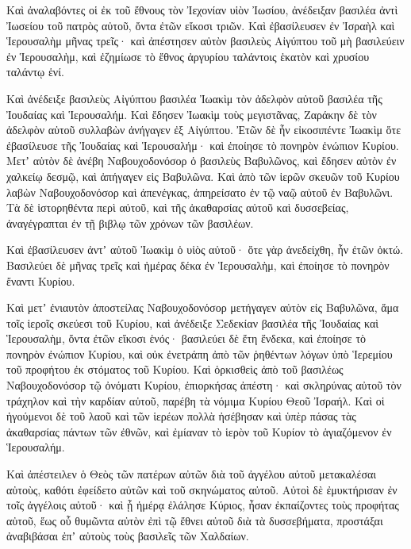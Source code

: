 {\par }{\PP {}Καὶ ἀναλαβόντες οἱ ἐκ τοῦ ἔθνους τὸν Ἰεχονίαν υἱὸν Ἰωσίου, ἀνέδειξαν βασιλέα ἀντὶ Ἰωσείου τοῦ πατρὸς αὐτοῦ, ὄντα ἐτῶν εἴκοσι τριῶν.
Καὶ ἐβασίλευσεν ἐν Ἰσραὴλ καὶ Ἱερουσαλὴμ μῆνας τρεῖς· καὶ ἀπέστησεν αὐτὸν βασιλεὺς Αἰγύπτου τοῦ μὴ βασιλεύειν ἐν Ἱερουσαλὴμ,
καὶ ἐζημίωσε τὸ ἔθνος ἀργυρίου ταλάντοις ἑκατὸν καὶ χρυσίου ταλάντῳ ἑνί.
\par }{\PP {}Καὶ ἀνέδειξε βασιλεὺς Αἰγύπτου βασιλέα Ἰωακὶμ τὸν ἀδελφὸν αὐτοῦ βασιλέα τῆς Ἰουδαίας καὶ Ἱερουσαλήμ.
Καὶ ἔδησεν Ἰωακὶμ τοὺς μεγιστᾶνας, Ζαράκην δὲ τὸν ἀδελφὸν αὐτοῦ συλλαβὼν ἀνήγαγεν ἐξ Αἰγύπτου.
Ἐτῶν δὲ ἦν εἰκοσιπέντε Ἰωακὶμ ὅτε ἐβασίλευσε τῆς Ἰουδαίας καὶ Ἱερουσαλήμ· καὶ ἐποίησε τὸ πονηρὸν ἐνώπιον Κυρίου.
Μετʼ αὐτὸν δὲ ἀνέβη Ναβουχοδονόσορ ὁ βασιλεὺς Βαβυλῶνος, καὶ ἔδησεν αὐτὸν ἐν χαλκείῳ δεσμῷ, καὶ ἀπήγαγεν εἰς Βαβυλῶνα.
Καὶ ἀπὸ τῶν ἱερῶν σκευῶν τοῦ Κυρίου λαβὼν Ναβουχοδονόσορ καὶ ἀπενέγκας, ἀπηρείσατο ἐν τῷ ναῷ αὐτοῦ ἐν Βαβυλῶνι.
Τὰ δὲ ἱστορηθέντα περὶ αὐτοῦ, καὶ τῆς ἀκαθαρσίας αὐτοῦ καὶ δυσσεβείας, ἀναγέγραπται ἐν τῇ βιβλῳ τῶν χρόνων τῶν βασιλέων.
\par }{\PP {}Καὶ ἐβασίλευσεν ἀντʼ αὐτοῦ Ἰωακὶμ ὁ υἱὸς αὐτοῦ· ὅτε γὰρ ἀνεδείχθη, ἦν ἐτῶν ὀκτώ.
Βασιλεύει δὲ μῆνας τρεῖς καὶ ἡμέρας δέκα ἐν Ἱερουσαλὴμ, καὶ ἐποίησε τὸ πονηρὸν ἔναντι Κυρίου.
\par }{\PP {}Καὶ μετʼ ἐνιαυτὸν ἀποστείλας Ναβουχοδονόσορ μετήγαγεν αὐτὸν εἰς Βαβυλῶνα, ἅμα τοῖς ἱεροῖς σκεύεσι τοῦ Κυρίου,
καὶ ἀνέδειξε Σεδεκίαν βασιλέα τῆς Ἰουδαίας καὶ Ἱερουσαλὴμ, ὄντα ἐτῶν εἴκοσι ἑνός· βασιλεύει δὲ ἔτη ἕνδεκα,
καὶ ἐποίησε τὸ πονηρὸν ἐνώπιον Κυρίου, καὶ οὐκ ἐνετράπη ἀπὸ τῶν ῥηθέντων λόγων ὑπὸ Ἱερεμίου τοῦ προφήτου ἐκ στόματος τοῦ Κυρίου.
Καὶ ὁρκισθεὶς ἀπὸ τοῦ βασιλέως Ναβουχοδονόσορ τῷ ὀνόματι Κυρίου, ἐπιορκήσας ἀπέστη· καὶ σκληρύνας αὐτοῦ τὸν τράχηλον καὶ τὴν καρδίαν αὐτοῦ, παρέβη τὰ νόμιμα Κυρίου Θεοῦ Ἰσραήλ.
Καὶ οἱ ἡγούμενοι δὲ τοῦ λαοῦ καὶ τῶν ἱερέων πολλὰ ἠσέβησαν καὶ ὑπὲρ πάσας τὰς ἀκαθαρσίας πάντων τῶν ἐθνῶν, καὶ ἐμίαναν τὸ ἱερὸν τοῦ Κυρίον τὸ ἁγιαζόμενον ἐν Ἱερουσαλήμ.
\par }{\PP {}Καὶ ἀπέστειλεν ὁ Θεὸς τῶν πατέρων αὐτῶν διὰ τοῦ ἀγγέλου αὐτοῦ μετακαλέσαι αὐτοὺς, καθότι ἐφείδετο αὐτῶν καὶ τοῦ σκηνώματος αὐτοῦ.
Αὐτοὶ δὲ ἐμυκτήρισαν ἐν τοῖς ἀγγέλοις αὐτοῦ·
καὶ ᾗ ἡμέρᾳ ἐλάλησε Κύριος, ἦσαν ἐκπαίζοντες τοὺς προφήτας αὐτοῦ, ἕως οὗ θυμῶντα αὐτὸν ἐπὶ τῷ ἔθνει αὐτοῦ διὰ τὰ δυσσεβήματα, προστάξαι ἀναβιβάσαι ἐπʼ αὐτοὺς τοὺς βασιλεῖς τῶν Χαλδαίων.
}
